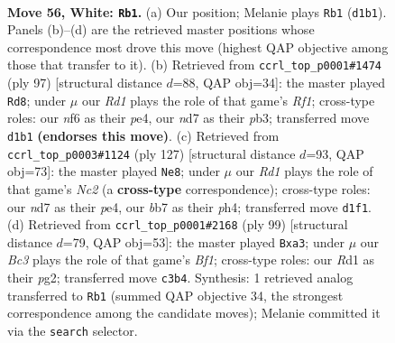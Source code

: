 \documentclass[11pt]{article}
\begin{document}
\clearpage

\begin{figure}[p]\centering
\begin{subfigure}{0.46\textwidth}\centering
\resizebox{\linewidth}{!}{%
\newchessgame
\chessboard[
  setfen={3q1k2/1b1n1p2/3P1n2/6Q1/p1p4P/2B2pP1/P6K/3R4 w - - 12 56},
  showmover=false,
  pgfstyle=straightmove, color=movearrow, markmove={d1-b1}
]}
\caption{}
\end{subfigure}\hfill
\begin{subfigure}{0.46\textwidth}\centering
\resizebox{\linewidth}{!}{%
\newchessgame
\chessboard[
  setfen={5r2/1p4pk/7p/4q3/3NP3/pPBKQ3/P7/8 b - - 13 49},
  showmover=false,
  pgfstyle=straightmove, color=movearrow, markmove={f8-d8}
]}
\caption{}
\end{subfigure}
\\[4pt]
\begin{subfigure}{0.46\textwidth}\centering
\resizebox{\linewidth}{!}{%
\newchessgame
\chessboard[
  setfen={8/2n3k1/2Pb2p1/1p2p1Pp/1NqpP2P/P2N4/6K1/5Q2 b - - 10 64},
  showmover=false,
  pgfstyle=straightmove, color=movearrow, markmove={c7-e8}
]}
\caption{}
\end{subfigure}\hfill
\begin{subfigure}{0.46\textwidth}\centering
\resizebox{\linewidth}{!}{%
\newchessgame
\chessboard[
  setfen={5bk1/2Q2p2/2N3p1/3PN2p/p4q2/P6P/6P1/7K b - - 2 50},
  showmover=false,
  pgfstyle=straightmove, color=movearrow, markmove={f8-a3}
]}
\caption{}
\end{subfigure}
\caption{\textbf{Move 56, White: \texttt{Rb1}.} (a) Our position; Melanie plays \texttt{Rb1} (\texttt{d1b1}). Panels (b)--(d) are the retrieved master positions whose correspondence most drove this move (highest QAP objective among those that transfer to it). (b) Retrieved from \texttt{ccrl\_top\_p0001\#1474} (ply 97) [structural distance $d$=88, QAP obj=34]: the master played \texttt{Rd8}; under $\mu$ our \emph{Rd1} plays the role of that game's \emph{Rf1}; cross-type roles: our \emph{n}f6 as their \emph{p}e4, our \emph{n}d7 as their \emph{p}b3; transferred move \texttt{d1b1} \textbf{(endorses this move)}. (c) Retrieved from \texttt{ccrl\_top\_p0003\#1124} (ply 127) [structural distance $d$=93, QAP obj=73]: the master played \texttt{Ne8}; under $\mu$ our \emph{Rd1} plays the role of that game's \emph{Nc2} (a \textbf{cross-type} correspondence); cross-type roles: our \emph{n}d7 as their \emph{p}e4, our \emph{b}b7 as their \emph{p}h4; transferred move \texttt{d1f1}. (d) Retrieved from \texttt{ccrl\_top\_p0001\#2168} (ply 99) [structural distance $d$=79, QAP obj=53]: the master played \texttt{Bxa3}; under $\mu$ our \emph{Bc3} plays the role of that game's \emph{Bf1}; cross-type roles: our \emph{R}d1 as their \emph{p}g2; transferred move \texttt{c3b4}. Synthesis: 1 retrieved analog transferred to \texttt{Rb1} (summed QAP objective 34, the strongest correspondence among the candidate moves); Melanie committed it via the \texttt{search} selector.}
\label{fig:thought-m110}
\end{figure}
\end{document}
